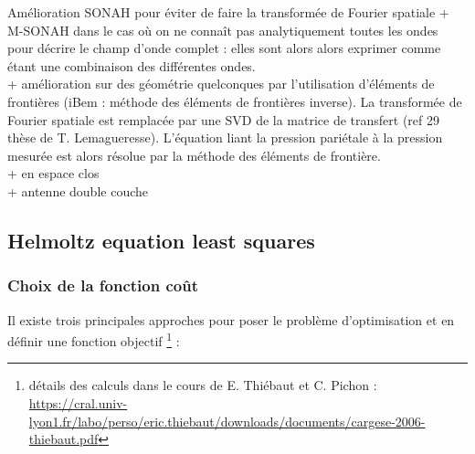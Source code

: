 Amélioration SONAH pour éviter de faire la transformée de Fourier spatiale %
 + M-SONAH dans le cas où on ne connaît pas analytiquement toutes les ondes pour décrire le champ d'onde complet : elles sont alors alors exprimer comme étant une combinaison des différentes ondes.\\
 
+ amélioration sur des géométrie quelconques par l'utilisation d'éléments de frontières (iBem : méthode des éléments de frontières inverse). La transformée de Fourier spatiale est remplacée par une SVD de la matrice de transfert (ref 29 thèse de T. Lemagueresse). L'équation liant la pression pariétale à  la pression mesurée est alors résolue par la méthode des éléments de frontière. \\
 
+ en espace clos\\

+ antenne double couche


\todo[inline]{
L'idée est de minimiser l'écart entre les signaux mesurés et ceux calculés à partir d'un modèle.

The polar correlation technique : JET ENGINE NOISE SOURCE LOCATION: 
THE 
POLAR 
CORRELATION 
TECHNIQUE 
M. 
J. 
FISHER

Noise source modelling and identi"cation procedure

}

\subsection{Helmoltz equation least squares}


\subsubsection{Choix de la fonction coût}

Il existe trois principales approches pour poser le problème d'optimisation et en définir une fonction objectif \footnote{détails des calculs dans le cours de E. Thiébaut et C. Pichon : \url{https://cral.univ-lyon1.fr/labo/perso/eric.thiebaut/downloads/documents/cargese-2006-thiebaut.pdf}} : 

